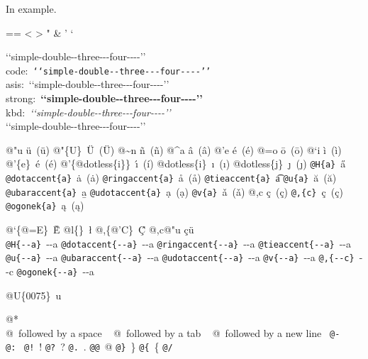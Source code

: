 \documentclass{book}
\makeatletter
\newcommand\Texinfocommandstyletextkbd[1]{{\ttfamily\textsl{#1}}}%
\newenvironment{Texinfopreformatted}{%
  \par\GNUTobeylines\obeyspaces\frenchspacing\parskip=\z@\parindent=\z@}{}
{\catcode`\^^M=13 \gdef\GNUTobeylines{\catcode`\^^M=13 \def^^M{\null\par}}}
\newenvironment{Texinfoindented}{\begin{list}{}{}\item\relax}{\end{list}}
\renewcommand{\_}{\Texinfounderscore\discretionary{}{}{}}
\makeatother
\begin{document}
In example.
\begin{Texinfoindented}
\begin{Texinfopreformatted}%
\ttfamily 
<
>
"
\&
'
`

{`}{`}simple-double{-}{-}three{-}{-}{-}four{-}{-}{-}-{'}{'}\leavevmode{}\\
code:\ \texttt{{`}{`}simple-double{-}{-}three{-}{-}{-}four{-}{-}{-}-{'}{'}}\ \leavevmode{}\\
asis:\ {`}{`}simple-double{-}{-}three{-}{-}{-}four{-}{-}{-}-{'}{'}\ \leavevmode{}\\
strong:\ \textbf{{`}{`}simple-double{-}{-}three{-}{-}{-}four{-}{-}{-}-{'}{'}}\ \leavevmode{}\\
kbd:\ \Texinfocommandstyletextkbd{{`}{`}simple-double{-}{-}three{-}{-}{-}four{-}{-}{-}-{'}{'}}\ \leavevmode{}\\

`\hbox{}`simple-double-\hbox{}-three{-}{-}{-}four{-}{-}{-}-'\hbox{}'\leavevmode{}\\

%
%
%
%

@"u \"{u}\ (ü)
@"\{U\}\ \"{U}\ (Ü) 
@\~{}n \~{n}\ (ñ)
@\^{}a \^{a}\ (â)
@'e \'{e}\ (é)
@=o \={o}\ (ō)
@`i \`{i}\ (ì)
@'\{e\}\ \'{e}\ (é)
@'\{@dotless\{i\}\}\ \'{\i{}}\ (í)
@dotless\{i\}\ \i{}\ (ı)
@dotless\{j\}\ \j{}\ (ȷ)
\texttt{@H\{a\}}\ \H{a}
\texttt{@dotaccent\{a\}}\ \.{a}\ (ȧ)
\texttt{@ringaccent\{a\}}\ \r{a}\ (å)
\texttt{@tieaccent\{a\}}\ \t{a}
\texttt{@u\{a\}}\ \u{a}\ (ă)
\texttt{@ubaraccent\{a\}}\ \b{a}
\texttt{@udotaccent\{a\}}\ \d{a}\ (ạ)
\texttt{@v\{a\}}\ \v{a}\ (ǎ)
@,c \c{c}\ (ç)
\texttt{@,\{c\}}\ \c{c}\ (ç)
\texttt{@ogonek\{a\}}\ \k{a}\ (ą)

@`\{@=E\}\ \`{\={E}}
@l\{\}\ \l{}
@,\{@'C\}\ \c{\'{C}}
@,c@"u \c{c}\"{u}\ \leavevmode{}\\

\texttt{@H\{{-}{-}a\}}\ \H{{-}{-}a}
\texttt{@dotaccent\{{-}{-}a\}}\ \.{{-}{-}a}
\texttt{@ringaccent\{{-}{-}a\}}\ \r{{-}{-}a}
\texttt{@tieaccent\{{-}{-}a\}}\ \t{{-}{-}a}
\texttt{@u\{{-}{-}a\}}\ \u{{-}{-}a}
\texttt{@ubaraccent\{{-}{-}a\}}\ \b{{-}{-}a}
\texttt{@udotaccent\{{-}{-}a\}}\ \d{{-}{-}a}
\texttt{@v\{{-}{-}a\}}\ \v{{-}{-}a}
\texttt{@,\{{-}{-}c\}}\ \c{{-}{-}c}
\texttt{@ogonek\{{-}{-}a\}}\ \k{{-}{-}a}

@U\{0075\}\ u

@* \leavevmode{}\\
@\ followed by a space
\ {}
@\ followed by a tab
\ {}
@\ followed by a new line
\ {}\texttt{@-}\ \-{}
\texttt{@:}\ \@
\texttt{@!}\ \@!
\texttt{@?}\ \@?
\texttt{@.}\ \@.
\texttt{@@}\ @
\texttt{@\}}\ \}
\texttt{@\{}\ \{
\texttt{@/}\ 


\end{Texinfopreformatted}
\end{Texinfoindented}
\end{document}
